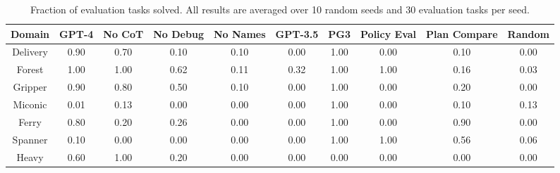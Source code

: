 \begin{table*}[t]
\centering
\begin{tabular}{cccccccccc} 
 \toprule
 \textbf{Domain} & GPT-4 & No CoT & No Debug & No Names & GPT-3.5 & PG3 & Policy Eval & Plan Compare & Random \\
 \midrule
 Delivery & 0.90 & 0.70 & 0.10 & 0.10 & 0.00 & 1.00 & 0.00 & 0.10 & 0.00 \\ 
 Forest & 1.00 & 1.00 & 0.62 & 0.11 & 0.32 & 1.00 & 1.00 & 0.16 & 0.03 \\ 
 Gripper & 0.90 & 0.80 & 0.50 & 0.10 & 0.00 & 1.00 & 0.00 & 0.20 & 0.00 \\ 
 Miconic & 0.01 & 0.13 & 0.00 & 0.00 & 0.00 & 1.00 & 0.00 & 0.10 & 0.13 \\ 
 Ferry & 0.80 & 0.20 & 0.26 & 0.00 & 0.00 & 1.00 & 0.00 & 0.90 & 0.00 \\ 
 Spanner & 0.10 & 0.00 & 0.00& 0.00 & 0.00  & 1.00 & 1.00 & 0.56 & 0.06 \\ 
 Heavy & 0.60 & 1.00 & 0.20 & 0.00 & 0.00 & 0.00 & 0.00 & 0.00 & 0.00 \\ 
 \bottomrule
\end{tabular}
\caption{Fraction of evaluation tasks solved. All results are averaged over 10 random seeds and 30 evaluation tasks per seed.}
\label{table:main_results}
\end{table*}

